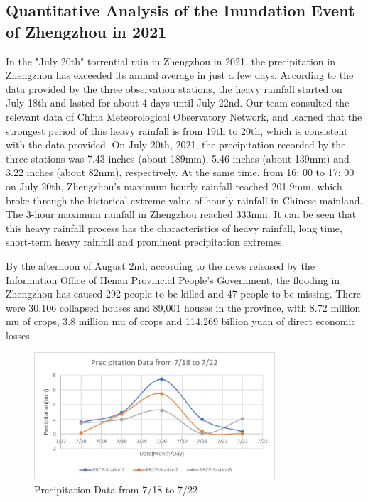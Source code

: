 \documentclass{swmcmthesis}
\begin{document}
\subsection{Quantitative Analysis of the
    Inundation Event of Zhengzhou in 2021}
\par
\hspace{1.25em}In the "July 20th" torrential rain in Zhengzhou in 2021, the precipitation in Zhengzhou has exceeded its annual average in just a few days. According to the data provided by the three observation stations, the heavy rainfall started on July 18th and lasted for about 4 days until July 22nd. Our team consulted the relevant data of China Meteorological Observatory Network, and learned that the strongest period of this heavy rainfall is from 19th to 20th, which is consistent with the data provided. On July 20th, 2021, the precipitation recorded by the three stations was 7.43 inches (about 189mm), 5.46 inches (about 139mm) and 3.22 inches (about 82mm), respectively. At the same time, from 16: 00 to 17: 00 on July 20th, Zhengzhou's maximum hourly rainfall reached 201.9mm, which broke through the historical extreme value of hourly rainfall in Chinese mainland. The 3-hour maximum rainfall in Zhengzhou reached 333mm. It can be seen that this heavy rainfall process has the characteristics of heavy rainfall, long time, short-term heavy rainfall and prominent precipitation extremes.
\par
By the afternoon of August 2nd, according to the news released by the Information Office of Henan Provincial People's Government, the flooding in Zhengzhou has caused 292 people to be killed and 47 people to be missing. There were 30,106 collapsed houses and 89,001 houses in the province, with 8.72 million mu of crops, 3.8 million mu of crops and 114.269 billion yuan of direct economic losses.
\par
\begin{figure}[h!t]
    \centering
    \includegraphics[width=0.8\textwidth]{precipitation_month_day.jpg}
    \caption{Precipitation Data from 7/18 to 7/22}
\end{figure}
\end{document}
